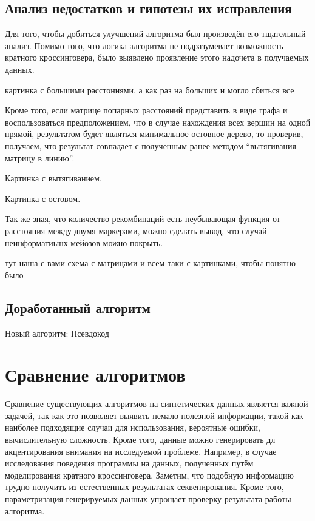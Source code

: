 \documentclass{matmex-diploma-custom}
\begin{document}
\subsection{Анализ недостатков и гипотезы их исправления}

Для того, чтобы добиться улучшений алгоритма был произведён его
тщательный анализ. Помимо того, что логика алгоритма не подразумевает
возможность кратного кроссинговера, было выявлено проявление этого
надочета в получаемых данных.

картинка с большими расстониями, а как раз на больших и могло сбиться все

Кроме того, если матрице попарных расстояний представить в виде графа
и воспользоваться предположением, что в случае нахождения всех вершин
на одной прямой, результатом будет являться минимальное остовное
дерево, то проверив, получаем, что результат совпадает с полученным
ранее методом ``вытягивания матрицу в линию''.

Картинка с вытягиванием.

Картинка с остовом.

Так же зная, что количество рекомбинаций  есть неубывающая функция от
расстояния между двумя маркерами, можно сделать вывод, что случай
неинформатиынх мейозов можно покрыть.

тут наша с вами схема с матрицами и всем таки с картинками, чтобы
понятно было


\subsection{Доработанный алгоритм}

Новый алгоритм:
Псевдокод

\section{Сравнение алгоритмов}

Сравнение существующих алгоритмов на синтетических данных является
важной задачей, так как это позволяет выявить немало полезной
информации, такой как наиболее подходящие случаи для использования,
вероятные ошибки, вычислительную сложность. Кроме того, данные можно
генерировать дл акцентирования внимания на исследуемой
проблеме. Например, в случае исследования поведения программы на
данных, полученных путём моделирования кратного
кроссинговера. Заметим, что подобную информацию трудно получить из
естественных результатах секвенирования. Кроме того, параметризация генерируемых
данных упрощает проверку результата работы алгоритма.
\end{document}
